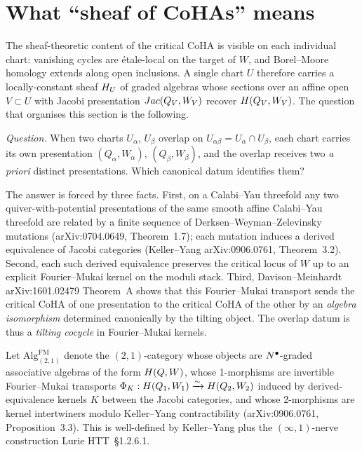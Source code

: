 \section{What ``sheaf of CoHAs'' means}
\label{sec:sheaf-of-cohas}

The sheaf-theoretic content of the critical CoHA is visible on each
individual chart: vanishing cycles are étale-local on the target of
$W$, and Borel--Moore homology extends along open inclusions. A
single chart $U$ therefore carries a locally-constant sheaf $H_U$
of graded algebras whose sections over an affine open $V \subset U$
with Jacobi presentation $Jac(Q_V, W_V)$ recover $H(Q_V, W_V)$.
The question that organises this section is the following.

\emph{Question.} When two charts $U_\alpha$, $U_\beta$ overlap on
$U_{\alpha\beta} = U_\alpha \cap U_\beta$, each chart carries its
own presentation $(Q_\alpha, W_\alpha)$, $(Q_\beta, W_\beta)$, and
the overlap receives two \emph{a priori} distinct presentations.
Which canonical datum identifies them?

The answer is forced by three facts. First, on a Calabi--Yau
threefold any two quiver-with-potential presentations of the same
smooth affine Calabi--Yau threefold are related by a finite sequence
of Derksen--Weyman--Zelevinsky mutations
(arXiv:0704.0649, Theorem~1.7); each mutation induces a derived
equivalence of Jacobi categories (Keller--Yang arXiv:0906.0761,
Theorem~3.2). Second, each such derived equivalence preserves the
critical locus of $W$ up to an explicit Fourier--Mukai kernel on
the moduli stack. Third, Davison--Meinhardt arXiv:1601.02479
Theorem~A shows that this Fourier--Mukai transport sends the
critical CoHA of one presentation to the critical CoHA of the other
by an \emph{algebra isomorphism} determined canonically by the
tilting object. The overlap datum is thus a \emph{tilting cocycle}
in Fourier--Mukai kernels.

Let $\mathrm{Alg}^{\mathrm{FM}}_{(2,1)}$ denote the
$(2,1)$-category whose objects are $N^\bullet$-graded associative
algebras of the form $H(Q, W)$, whose 1-morphisms are invertible
Fourier--Mukai transports $\Phi_K: H(Q_1, W_1) \xrightarrow{\sim}
H(Q_2, W_2)$ induced by derived-equivalence kernels $K$ between
the Jacobi categories, and whose 2-morphisms are kernel intertwiners
modulo Keller--Yang contractibility (arXiv:0906.0761,
Proposition~3.3). This is well-defined by Keller--Yang plus the
$(\infty,1)$-nerve construction Lurie HTT~\S1.2.6.1.

